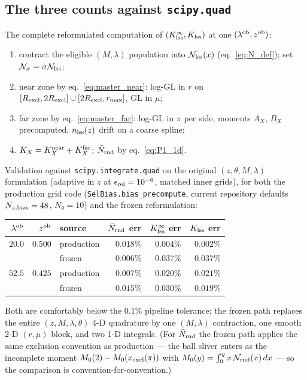 \documentclass[a4paper, 11pt]{article}
\newcommand{\lob}{\lambda^{\rm ob}}
\newcommand{\zob}{z^{\rm ob}}
\newcommand{\Rex}{R_{\rm excl}}
\newcommand{\nlss}{n_{\rm lss}}
\newcommand{\Ncal}{\mathcal{N}}
\newcommand{\Nbar}{\bar{N}_{\rm rnd}}
\newcommand{\Klss}{K_{\rm lss}}
\newcommand{\KlssInf}{K_{\rm lss}^{\infty}}
\begin{document}
\subsection{The three counts against \texorpdfstring{\texttt{scipy.quad}}{scipy.quad}}
\label{sec:quad_validation}

The complete reformulated computation of $(\KlssInf, \Klss)$ at one
$(\lob,\zob)$:
\begin{enumerate}
\item contract the eligible $(M,\lambda)$ population into
      $\Ncal_{\rm lss}(x)$ (eq.~\ref{eq:N_def}); set
      $\Ncal_\sigma = \sigma\Ncal_{\rm lss}$;
\item near zone by eq.~\eqref{eq:master_near}: log-GL in $r$ on
      $[\Rex,2\Rex]\cup[2\Rex,r_{\max}]$, GL in $\mu$;
\item far zone by eq.~\eqref{eq:master_far}: log-GL in $\pi$ per
      side, moments $A_X$, $B_X$ precomputed, $\nlss(z)$ drift on
      a coarse spline;
\item $K_X = K_X^{\rm near} + K_X^{\rm far}$; $\Nbar$ by
      eq.~\eqref{eq:P1_1d}.
\end{enumerate}
Validation against \texttt{scipy.integrate.quad} on the original
$(z,\theta,M,\lambda)$ formulation (adaptive in $z$ at
$\epsilon_{\rm rel}=10^{-6}$, matched inner grids), for both the
production grid code (\texttt{SelBias.bias\_precompute}, current
repository defaults $N_{z,\rm bias}=48$, $N_\theta=10$) and the
frozen reformulation:
\begin{center}
\small
\begin{tabular}{r r l r r r}
\toprule
$\lob$ & $\zob$ & source & $\Nbar$ err & $\KlssInf$ err & $\Klss$ err \\
\midrule
$20.0$ & $0.500$ & production & $0.018\%$ & $0.004\%$ & $0.002\%$ \\
       &         & frozen     & $0.006\%$ & $0.037\%$ & $0.037\%$ \\
$52.5$ & $0.425$ & production & $0.007\%$ & $0.020\%$ & $0.021\%$ \\
       &         & frozen     & $0.015\%$ & $0.030\%$ & $0.019\%$ \\
\bottomrule
\end{tabular}
\end{center}
Both are comfortably below the $0.1\%$ pipeline tolerance; the
frozen path replaces the entire $(z,M,\lambda,\theta)$ 4-D
quadrature by one $(M,\lambda)$ contraction, one smooth 2-D
$(r,\mu)$ block, and two 1-D integrals. (For $\Nbar$ the frozen
path applies the same exclusion convention as production --- the
ball sliver enters as the incomplete moment
$M_0(2)-M_0(x_{\rm excl}(\pi))$ with
$M_0(y)=\int_0^y x\,\Ncal_{\rm rnd}(x)\,dx$ --- so the comparison is
convention-for-convention.)
\end{document}

